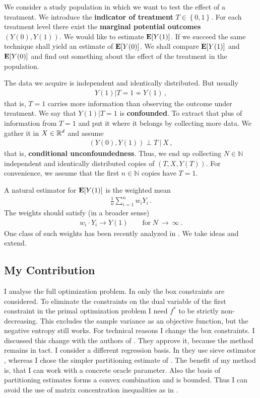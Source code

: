 We consider a study population in which we want to test the effect of a treatment.
We introduce the \textbf{indicator of treatment} $T\in \left\{ 0,1 \right\}$.
For each treatment level there exist the \textbf{marginal potential outcomes}
$(Y(0),Y(1))$. We would like to estimate $\mathbf{E}[Y(1)]$. If we succeed the same technique
shall yield an estimate of $\mathbf{E}[Y(0)]$. We shall compare $\mathbf{E}[Y(1)]$ and $\mathbf{E}[Y(0)]$ and 
find out something about the effect of the treatment in the population.

The data we acquire is independent and identically distributed. But usually
\begin{gather}
  Y(1)|T=1 \nsim Y(1) 
  \,,
\end{gather}
that is, $T=1$ carries more information than observing the outcome under treatment.
We say that $Y(1)|T=1$ is \textbf{confounded}. To extract that plus of information from $T=1$ and put it where it belongs by collecting more data.
We gather it in $X\in \mathbb{R}^d$ and assume
\begin{gather}
  (Y(0),Y(1))
  \perp
  T
  \ 
  |
  \ 
  X
  \,,
\end{gather}
that is, \textbf{conditional unconfoundedness}.
Thus, we end up collecting $N\in \mathbb{N}$ independent and identically distributed copies of 
$(T,X,Y(T))$. For convenience, we assume that the first $n\in \mathbb{N}$ copies have $T=1$.

A natural estimator for $\mathbf{E}[Y(1)]$ is the weighted mean
\begin{gather}
  \frac{1}{n}
  \sum_{i=1}^{n} 
  w_i Y_i
  \,.
\end{gather}
The weights should satisfy (in a broader sense)
\begin{gather}
  w_i\cdot Y_i \to Y(1)
  \qquad 
  \text{for}\ 
  N
  \ 
  \to
  \ 
  \infty
  \,.
\end{gather}
One class of such weights has been recently analyzed in \cite{Wang2019}.
We take ideas and extend.

\subsection*{My Contribution}
I analyse the full optimization problem. In \cite{Wang2019} only the box constraints are considered.
To eliminate the constraints on the dual variable of the first constraint in the primal optimization problem I need $f^*$ to be strictly non-decreasing. This excludes the sample variance as an objective function, but the negative entropy still works.
For technical reasons I change the box constraints. I discussed this change with the authors of \cite{Wang2019}. They approve it, because the method remains in tact.
I consider a different regression basis. In \cite{Wang2019} they use sieve estimator \cite{Newey1997a}, whereas I chose the simpler partitioning estimate of \cite{Gyorfi2002}.
The benefit of my method is, that I can work with a concrete oracle parameter.
Also the basis of partitioning estimates forms a convex combination and is bounded. Thus I can avoid the use of matrix concentration inequalities as in \cite{Wang2019}.

